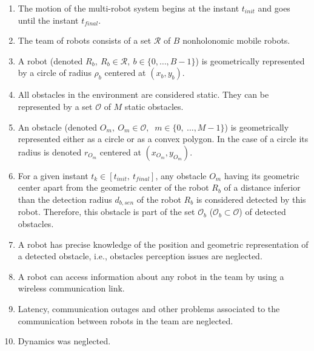 \documentclass[eprint]{actapoly}
\begin{document}
\begin{enumerate}

    \item The motion of the multi-robot system begins at
    the instant $t_{init}$ and goes until the instant $t_{final}$.

    \item The team of robots consists of a set $\mathcal{R}$ of $B$
    nonholonomic mobile robots.
    
    \item A robot (denoted $R_b,\ R_b \in \mathcal{R},\ b \in \{0,\dots,B-1\}$) is 
    geometrically represented by a circle of radius $\rho_b$ centered at
    $(x_b, y_b)$.
        
    \item All obstacles in the environment are considered static. They can be
    represented by a set $\mathcal{O}$ of $M$ static obstacles.
    
    \item An obstacle (denoted $O_m,\ $\mbox{$O_m \in \mathcal{O}$}$,\ $
    \mbox{$m \in \{0,\ \dots, M-1\}$}) is geometrically represented either as
    a circle or as a convex polygon. In the case of a circle its radius is
    denoted $r_{O_m}$ centered at $(x_{O_m},y_{O_m})$.
    
    \item For a given instant $t_k \in [t_{init},\ t_{final}]$, any obstacle
    $O_m$ having its geometric center apart from the geometric center of the
    robot $R_b$ of a distance inferior than the detection radius $d_{b,sen}$
    of the robot $R_b$ is considered detected by this robot.
    Therefore, this obstacle is part of the set $\mathcal{O}_b$
    ($\mathcal{O}_b \subset \mathcal{O}$) of detected obstacles.
    
    \item A robot has precise knowledge of the position and geometric 
    representation of a detected obstacle, i.e., obstacles perception issues
    are neglected.
    
    \item A robot can access 
    information about any robot in the team by using 
    a wireless communication link.
    
    \item Latency, communication outages and other problems associated
    to the communication between robots in the team are neglected.
        
    \item Dynamics was neglected.
    

\end{enumerate}
\end{document}
